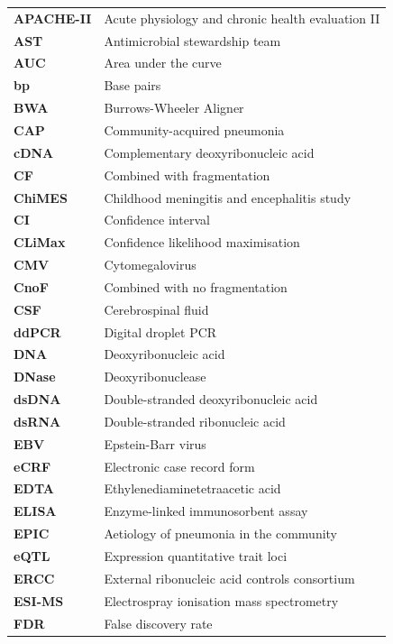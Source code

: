 \begin{longtable}[l]{l l}

		\textbf{APACHE-II} & Acute physiology and chronic health evaluation II\\
		\textbf{AST} & Antimicrobial stewardship team\\
		\textbf{AUC} & Area under the curve\\
		\textbf{bp} & Base pairs\\
		\textbf{BWA} & Burrows-Wheeler Aligner\\
		\textbf{CAP} & Community-acquired pneumonia\\
		\textbf{cDNA} & Complementary deoxyribonucleic acid\\
		\textbf{CF} & Combined with fragmentation\\
		\textbf{ChiMES} & Childhood meningitis and encephalitis study\\
		\textbf{CI} & Confidence interval\\
		\textbf{CLiMax} & Confidence likelihood maximisation\\
		\textbf{CMV} & Cytomegalovirus\\
		\textbf{CnoF} & Combined with no fragmentation\\
		\textbf{CSF} & Cerebrospinal fluid\\
		\textbf{ddPCR} & Digital droplet PCR\\
		\textbf{DNA} & Deoxyribonucleic acid\\
		\textbf{DNase} & Deoxyribonuclease\\
		\textbf{dsDNA} & Double-stranded deoxyribonucleic acid\\
		\textbf{dsRNA} & Double-stranded ribonucleic acid\\
		\textbf{EBV} & Epstein-Barr virus\\
		\textbf{eCRF} & Electronic case record form\\
		\textbf{EDTA} & Ethylenediaminetetraacetic acid\\
		\textbf{ELISA} & Enzyme-linked immunosorbent assay\\
		\textbf{EPIC} & Aetiology of pneumonia in the community\\
		\textbf{eQTL} & Expression quantitative trait loci\\
		\textbf{ERCC} & External ribonucleic acid controls consortium\\
		\textbf{ESI-MS} & Electrospray ionisation mass spectrometry\\
		\textbf{FDR} & False discovery rate\\

\end{longtable}
